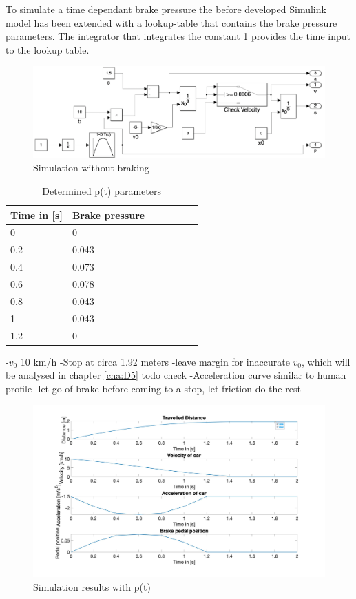 To simulate a time dependant brake pressure the before developed Simulink model has been extended with a lookup-table that contains the brake pressure parameters. The integrator that integrates the constant 1 provides the time input to the lookup table.
\begin{figure}[H]
\centering
\includegraphics[width=1\textwidth]{images/D3_model_extension.png}
\caption{Simulation without braking}
\label{fig:D3_IndividualBraking2}
\end{figure}

\begin{table}[H]
\centering
\caption{Determined p(t) parameters}
\renewcommand{\arraystretch}{1}
\begin{tabular}{lllllll}
\textbf{Time in [s]} & \textbf{Brake pressure}\\\hline
0 & 0\\
0.2  & 0.043\\
0.4  & 0.073\\
0.6  & 0.078\\
0.8  & 0.043\\
1  & 0.043\\
1.2  & 0\\
\end{tabular}
\end{table}

-$v_0$ 10 km/h
-Stop at circa 1.92 meters
-leave margin for inaccurate $v_0$, which will be analysed in chapter \ref{cha:D5} todo check
-Acceleration curve similar to human profile
-let go of brake before coming to a stop, let friction do the rest
\begin{figure}[H]
\centering
\includegraphics[width=1\textwidth]{images/D3_pt.jpg}
\caption{Simulation results with p(t)}
\label{fig:D3_IndividualBraking2}
\end{figure}

